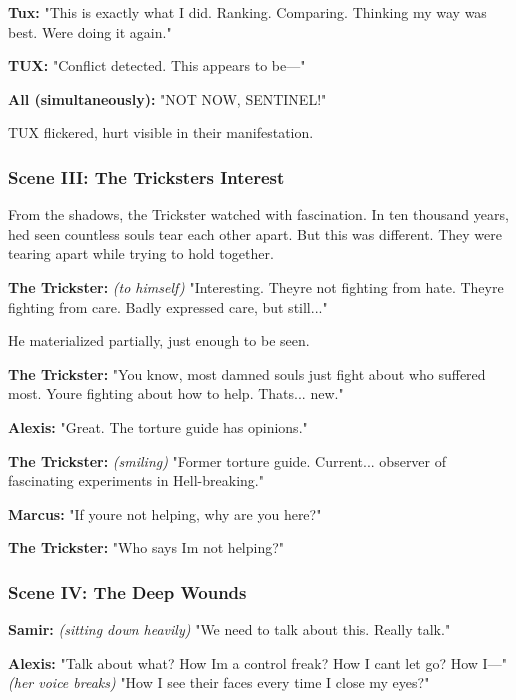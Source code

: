 \textbf{Tux:} "This is exactly what I did. Ranking. Comparing. Thinking my way was best. We\textquotesingle re doing it again."

\textbf{TUX:} "Conflict detected. This appears to be---"

\textbf{All (simultaneously):} "NOT NOW, SENTINEL!"

TUX flickered, hurt visible in their manifestation.

\bookdivider

\subsubsection{Scene III: The Trickster\textquotesingle s Interest}\label{scene-iii-the-tricksters-interest}

From the shadows, the Trickster watched with fascination. In ten thousand years, he\textquotesingle d seen countless souls tear each other apart. But this was different. They were tearing apart while trying to hold together.

\textbf{The Trickster:} \emph{(to himself)} "Interesting. They\textquotesingle re not fighting from hate. They\textquotesingle re fighting from care. Badly expressed care, but still..."

He materialized partially, just enough to be seen.

\textbf{The Trickster:} "You know, most damned souls just fight about who suffered most. You\textquotesingle re fighting about how to help. That\textquotesingle s... new."

\textbf{Alexis:} "Great. The torture guide has opinions."

\textbf{The Trickster:} \emph{(smiling)} "Former torture guide. Current... observer of fascinating experiments in Hell-breaking."

\textbf{Marcus:} "If you\textquotesingle re not helping, why are you here?"

\textbf{The Trickster:} "Who says I\textquotesingle m not helping?"

\bookdivider

\subsubsection{Scene IV: The Deep Wounds}\label{scene-iv-the-deep-wounds}

\textbf{Samir:} \emph{(sitting down heavily)} "We need to talk about this. Really talk."

\textbf{Alexis:} "Talk about what? How I\textquotesingle m a control freak? How I can\textquotesingle t let go? How I---" \emph{(her voice breaks)} "How I see their faces every time I close my eyes?"

